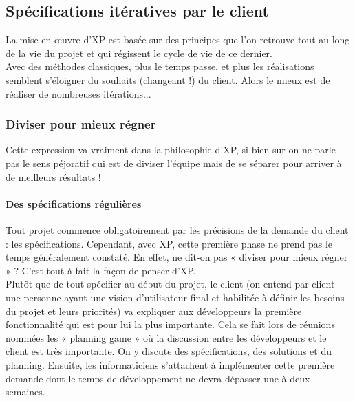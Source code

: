 \documentclass[]{article}
\let\oldparagraph\paragraph
\renewcommand{\paragraph}[1]{\oldparagraph{#1}\mbox{}}
\begin{document}
\hypertarget{spuxe9cifications-ituxe9ratives-par-le-client}{%
\subsection{\texorpdfstring{\textbf{Spécifications itératives par le
client}}{Spécifications itératives par le client}}\label{spuxe9cifications-ituxe9ratives-par-le-client}}

La mise en œuvre d'XP est basée sur des principes que l'on retrouve tout
au long de la vie du projet et qui régissent le cycle de vie de ce
dernier.\\
Avec des méthodes classiques, plus le temps passe, et plus les
réalisations semblent s'éloigner du souhaits (changeant !) du client.
Alors le mieux est de réaliser de nombreuses itérations...


\hypertarget{diviser-pour-mieux-ruxe9gner}{%
\subsubsection{Diviser pour mieux
régner}\label{diviser-pour-mieux-ruxe9gner}}

Cette expression va vraiment dans la philosophie d'XP, si bien sur on ne
parle pas le sens péjoratif qui est de diviser l'équipe mais de se
séparer pour arriver à de meilleurs résultats !




\hypertarget{des-spuxe9cifications-ruxe9guliuxe8res}{%
\paragraph{Des spécifications
régulières}\label{des-spuxe9cifications-ruxe9guliuxe8res}}

Tout projet commence obligatoirement par les précisions de la demande du
client : les spécifications. Cependant, avec XP, cette première phase ne
prend pas le temps généralement constaté. En effet, ne dit-on pas «
diviser pour mieux régner » ? C'est tout à fait la façon de penser
d'XP.~\\
Plutôt que de tout spécifier au début du projet, le client (on entend
par client une personne ayant une vision d'utilisateur final et
habilitée à définir les besoins du projet et leurs priorités) va
expliquer aux développeurs la première fonctionnalité qui est pour lui
la plus importante. Cela se fait lors de réunions nommées les « planning
game » où la discussion entre les développeurs et le client est très
importante. On y discute des spécifications, des solutions et du
planning. Ensuite, les informaticiens s'attachent à implémenter cette
première demande dont le temps de développement ne devra dépasser une à
deux semaines.~
\end{document}
